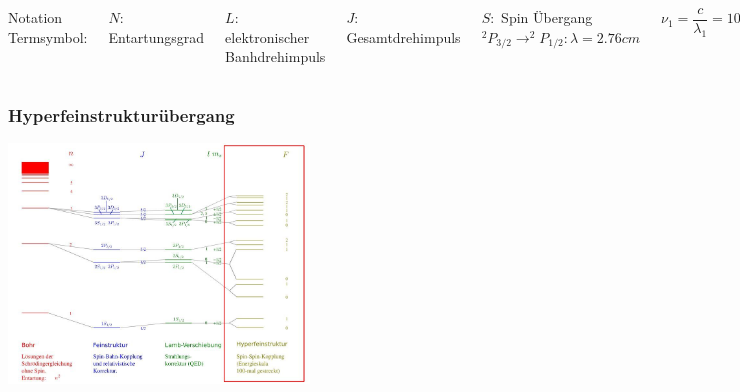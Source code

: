 \begin{frame}
	\begin{columns}
		
		Notation Termsymbol: 

		\vspace{1cm}	
				
		$N:$ Entartungsgrad
		
		$L:$ elektronischer Banhdrehimpuls
		
		$J:$ Gesamtdrehimpuls
		
		$S:$ Spin
		\vspace{1cm}
		Übergang $^2P_{3/2} \rightarrow ^2P_{1/2}: \lambda = 2.76cm$
				
		$\nu_1 = \dfrac{c}{\lambda_1} = 10,9 GHz $
		\vspace{.5cm}
				
		\includegraphics[width = 4cm]{./pictures/orbitale}
		
		\includegraphics[width = 4cm]{./pictures/wasserstoffSpektrum}
			
		\includegraphics[width = 4cm]{./pictures/fine_structure_hydrogen}
	\end{columns}
\end{frame}

\begin{frame}
	\frametitle {Hyperfeinstrukturübergang}
	
	\begin{center}
		\includegraphics[width = 8cm]{./pictures/energieniveaus3}
	\end{center}
	
\end{frame}


